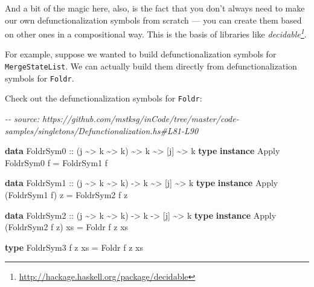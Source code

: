 \documentclass[]{article}
\newenvironment{Shaded}{}{}
\newcommand{\CommentTok}[1]{\textcolor[rgb]{0.38,0.63,0.69}{\textit{#1}}}
\newcommand{\DataTypeTok}[1]{\textcolor[rgb]{0.56,0.13,0.00}{#1}}
\newcommand{\KeywordTok}[1]{\textcolor[rgb]{0.00,0.44,0.13}{\textbf{#1}}}
\newcommand{\NormalTok}[1]{#1}
\newcommand{\OperatorTok}[1]{\textcolor[rgb]{0.40,0.40,0.40}{#1}}
\newcommand{\OtherTok}[1]{\textcolor[rgb]{0.00,0.44,0.13}{#1}}
\renewcommand{\href}[2]{#2\footnote{\url{#1}}}
\begin{document}
And a bit of the magic here, also, is the fact that you don't always need to
make our own defunctionalization symbols from scratch --- you can create them
based on other ones in a compositional way. This is the basis of libraries like
\emph{\href{http://hackage.haskell.org/package/decidable}{decidable}}.

For example, suppose we wanted to build defunctionalization symbols for
\texttt{MergeStateList}. We can actually build them directly from
defunctionalization symbols for \texttt{Foldr}.

Check out the defunctionalization symbols for \texttt{Foldr}:

\begin{Shaded}
\begin{Highlighting}[]
\CommentTok{{-}{-} source: https://github.com/mstksg/inCode/tree/master/code{-}samples/singletons/Defunctionalization.hs\#L81{-}L90}

\KeywordTok{data} \DataTypeTok{FoldrSym0}\OtherTok{ ::}\NormalTok{ (j }\OperatorTok{\textasciitilde{}\textgreater{}}\NormalTok{ k }\OperatorTok{\textasciitilde{}\textgreater{}}\NormalTok{ k) }\OperatorTok{\textasciitilde{}\textgreater{}}\NormalTok{ k }\OperatorTok{\textasciitilde{}\textgreater{}}\NormalTok{ [j] }\OperatorTok{\textasciitilde{}\textgreater{}}\NormalTok{ k}
\KeywordTok{type} \KeywordTok{instance} \DataTypeTok{Apply} \DataTypeTok{FoldrSym0}\NormalTok{ f }\OtherTok{=} \DataTypeTok{FoldrSym1}\NormalTok{ f}

\KeywordTok{data} \DataTypeTok{FoldrSym1}\OtherTok{ ::}\NormalTok{ (j }\OperatorTok{\textasciitilde{}\textgreater{}}\NormalTok{ k }\OperatorTok{\textasciitilde{}\textgreater{}}\NormalTok{ k) }\OtherTok{{-}\textgreater{}}\NormalTok{ k }\OperatorTok{\textasciitilde{}\textgreater{}}\NormalTok{ [j] }\OperatorTok{\textasciitilde{}\textgreater{}}\NormalTok{ k}
\KeywordTok{type} \KeywordTok{instance} \DataTypeTok{Apply}\NormalTok{ (}\DataTypeTok{FoldrSym1}\NormalTok{ f) z }\OtherTok{=} \DataTypeTok{FoldrSym2}\NormalTok{ f z}

\KeywordTok{data} \DataTypeTok{FoldrSym2}\OtherTok{ ::}\NormalTok{ (j }\OperatorTok{\textasciitilde{}\textgreater{}}\NormalTok{ k }\OperatorTok{\textasciitilde{}\textgreater{}}\NormalTok{ k) }\OtherTok{{-}\textgreater{}}\NormalTok{ k }\OtherTok{{-}\textgreater{}}\NormalTok{ [j] }\OperatorTok{\textasciitilde{}\textgreater{}}\NormalTok{ k}
\KeywordTok{type} \KeywordTok{instance} \DataTypeTok{Apply}\NormalTok{ (}\DataTypeTok{FoldrSym2}\NormalTok{ f z) xs }\OtherTok{=} \DataTypeTok{Foldr}\NormalTok{ f z xs}

\KeywordTok{type} \DataTypeTok{FoldrSym3}\NormalTok{ f z xs }\OtherTok{=} \DataTypeTok{Foldr}\NormalTok{ f z xs}
\end{Highlighting}
\end{Shaded}
\end{document}
